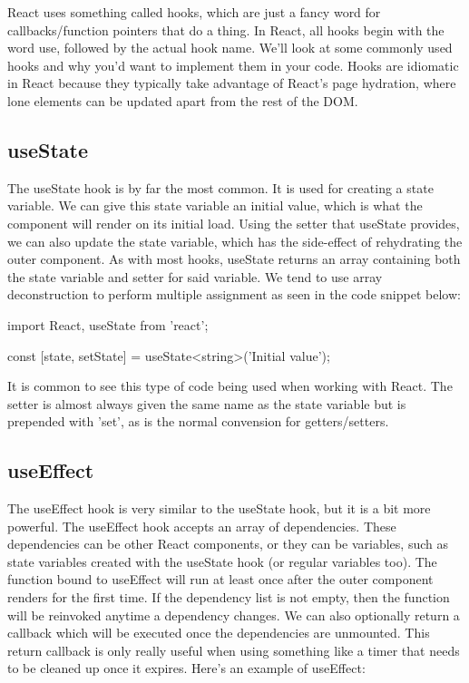 \documentclass{article}
\begin{document}
React uses something called hooks, which are just a fancy word for callbacks/function pointers that do a thing.
In React, all hooks begin with the word use, followed by the actual hook name. We'll look at some commonly
used hooks and why you'd want to implement them in your code. Hooks are idiomatic in React because they
typically take advantage of React's page hydration, where lone elements can be updated apart from the rest of
the DOM.

\subsection{useState}

The useState hook is by far the most common. It is used for creating a state variable. We can give this state
variable an initial value, which is what the component will render on its initial load. Using the setter that
useState provides, we can also update the state variable, which has the side-effect of rehydrating the outer
component. As with most hooks, useState returns an array containing both the state variable and setter for
said variable. We tend to use array deconstruction to perform multiple assignment as seen in the code snippet
below:

\begin{tslst}

import React, { useState } from 'react';

const [state, setState] = useState<string>('Initial value');

\end{tslst}

It is common to see this type of code being used when working with React. The setter is almost always given the
same name as the state variable but is prepended with 'set', as is the normal convension for getters/setters.

\subsection{useEffect}

The useEffect hook is very similar to the useState hook, but it is a bit more powerful. The useEffect hook
accepts an array of dependencies. These dependencies can be other React components, or they can be variables,
such as state variables created with the useState hook (or regular variables too). The function bound to
useEffect will run at least once after the outer component renders for the first time. If the dependency list
is not empty, then the function will be reinvoked anytime a dependency changes. We can also optionally return
a callback which will be executed once the dependencies are unmounted. This return callback is only really
useful when using something like a timer that needs to be cleaned up once it expires. Here's an example of
useEffect:
\end{document}
